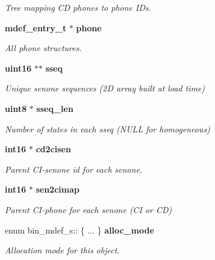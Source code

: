 \begin{DoxyCompactItemize}
\begin{DoxyCompactList}\small\item\em \-Tree mapping \-C\-D phones to phone \-I\-Ds. \end{DoxyCompactList}\item 
{\bf mdef\-\_\-entry\-\_\-t} $\ast$ {\bf phone}\label{structbin__mdef__s_a2c73ae900d198460a30bce4f641d8398}

\begin{DoxyCompactList}\small\item\em \-All phone structures. \end{DoxyCompactList}\item 
{\bf uint16} $\ast$$\ast$ {\bf sseq}\label{structbin__mdef__s_acb58480658812de7a357dcbd25ad7b41}

\begin{DoxyCompactList}\small\item\em \-Unique senone sequences (2\-D array built at load time) \end{DoxyCompactList}\item 
{\bf uint8} $\ast$ {\bf sseq\-\_\-len}\label{structbin__mdef__s_ab534bbd280015795b8e8ca4e296f4946}

\begin{DoxyCompactList}\small\item\em \-Number of states in each sseq (\-N\-U\-L\-L for homogeneous) \end{DoxyCompactList}\item 
{\bf int16} $\ast$ {\bf cd2cisen}\label{structbin__mdef__s_ad5e814ffa116c85d46359e3ffd40bff7}

\begin{DoxyCompactList}\small\item\em \-Parent \-C\-I-\/senone id for each senone. \end{DoxyCompactList}\item 
{\bf int16} $\ast$ {\bf sen2cimap}\label{structbin__mdef__s_a457e5352e52a57de5d1536bcd6b331a9}

\begin{DoxyCompactList}\small\item\em \-Parent \-C\-I-\/phone for each senone (\-C\-I or \-C\-D) \end{DoxyCompactList}\item 
enum bin\-\_\-mdef\-\_\-s\-:: \{ ... \}  {\bf alloc\-\_\-mode}
\begin{DoxyCompactList}\small\item\em \-Allocation mode for this object. \end{DoxyCompactList}\end{DoxyCompactItemize}


